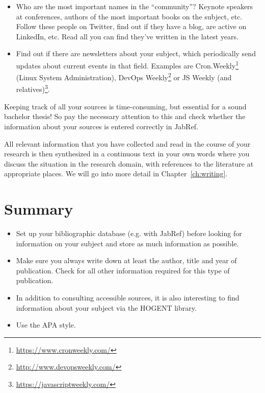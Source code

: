 \begin{itemize}
  \item Who are the most important names in the ``community''? Keynote speakers at conferences, authors of the most important books on the subject, etc. Follow these people on Twitter, find out if they have a blog, are active on LinkedIn, etc. Read all you can find they've written in the latest years.
  
  \item Find out if there are newsletters about your subject, which periodically send updates about current events in that field. Examples are Cron.Weekly\footnote{\url{https://www.cronweekly.com/}} (Linux System Administration), DevOps Weekly\footnote{\url{http://www.devopsweekly.com/}} or JS Weekly (and relatives)\footnote{\url{https://javascriptweekly.com/}}.
\end{itemize}

Keeping track of all your sources is time-consuming, but essential for a sound bachelor thesis! So pay the necessary attention to this and check whether the information about your sources is entered correctly in JabRef.

All relevant information that you have collected and read in the course of your research is then synthesized in a continuous text in your own words where you discuss the situation in the research domain, with references to the literature at appropriate places. We will go into more detail in Chapter~\ref{ch:writing}.

\section{Summary}
\label{sec:bibliography-summary}

\begin{itemize}
    \item Set up your bibliographic database (e.g. with JabRef) before looking for information on your subject and store as much information as possible.
    \item Make sure you always write down at least the author, title and year of publication. Check for all other information required for this type of publication.
    \item In addition to consulting accessible sources, it is also interesting to find information about your subject via the HOGENT library.
    \item Use the APA style. 
\end{itemize}
